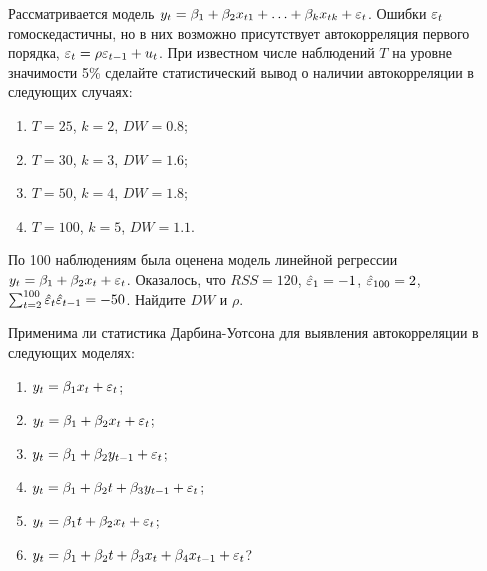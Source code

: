 \begin{problem}
Рассматривается модель $y_t=\beta_1+\beta_2 x_{t1}+\ldots+\beta_k x_{tk}+\varepsilon_t$. Ошибки $\varepsilon_t$ гомоскедастичны, но в них возможно присутствует автокорреляция первого порядка, $\varepsilon_t=\rho \varepsilon_{t-1}+u_t$. При известном числе наблюдений $T$ на уровне значимости 5\% сделайте статистический вывод о наличии автокорреляции в следующих случаях:
\begin{enumerate}
\item $T=25$, $k=2$, $DW=0.8$;
\item $T=30$, $k=3$, $DW=1.6$;
\item $T=50$, $k=4$, $DW=1.8$;
\item $T=100$, $k=5$, $DW=1.1$.
\end{enumerate}


\begin{sol}
\end{sol}
\end{problem}



\begin{problem}
По 100 наблюдениям была оценена модель линейной регрессии
$y_t=\beta_1+\beta_2 x_t+\varepsilon_t$. Оказалось, что $RSS=120$, $\hat{\varepsilon}_1=-1$, $\hat{\varepsilon}_{100}=2$, $\sum_{t=2}^{100} \hat{\varepsilon}_t\hat{\varepsilon}_{t-1}=-50$. Найдите $DW$ и $\rho$.


\begin{sol}
\end{sol}
\end{problem}



\begin{problem}
Применима ли статистика Дарбина-Уотсона для выявления автокорреляции в следующих моделях:
\begin{enumerate}
\item $y_t=\beta_1 x_t + \varepsilon_t$;
\item $y_t=\beta_1 + \beta_2 x_t + \varepsilon_t$;
\item $y_t=\beta_1 + \beta_2 y_{t-1} + \varepsilon_t$;
\item $y_t=\beta_1 + \beta_2 t +\beta_3 y_{t-1} + \varepsilon_t$;
\item $y_t=\beta_1 t + \beta_2 x_t + \varepsilon_t$;
\item $y_t=\beta_1 + \beta_2 t +\beta_3 x_t +\beta_4 x_{t-1} + \varepsilon_t$?
\end{enumerate}


\begin{sol}
\end{sol}
\end{problem}



